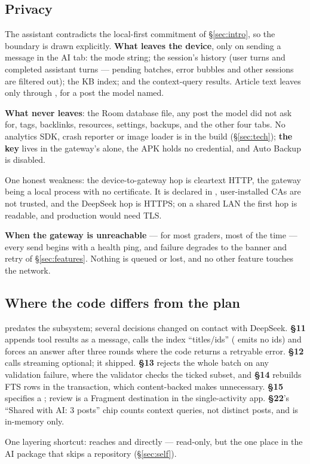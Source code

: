 \subsection{Privacy}

The assistant contradicts the local-first commitment of \S\ref{sec:intro}, so the boundary is drawn
explicitly. \textbf{What leaves the device}, only on sending a message in the AI tab: the mode string; the
session's
history (user turns and completed assistant turns --- pending batches, error bubbles and other sessions are
filtered out); the KB index; and the context-query results. Article text leaves only through
, for a post the model named.

\textbf{What never leaves}: the Room database file, any post the model did not ask for, tags, backlinks,
resources, settings, backups, and the other four tabs. No analytics SDK, crash reporter or image loader is
in the build (\S\ref{sec:tech}); \textbf{the key} lives in the gateway's  alone, the APK holds no
credential, and Auto Backup is disabled.

One honest weakness: the device-to-gateway hop is cleartext HTTP, the gateway being a local process with no
certificate. It is declared in , user-installed CAs are not trusted, and
the DeepSeek hop is HTTPS; on a shared LAN the first hop is readable, and production would need TLS.

\textbf{When the gateway is unreachable} --- for most graders, most of the time --- every send begins with a
health ping, and failure degrades to the banner and retry of \S\ref{sec:features}. Nothing is queued or
lost, and no other feature touches the network.

\subsection{Where the code differs from the plan}

 predates the subsystem; several decisions changed on contact with DeepSeek.
\textbf{\S11} appends tool results as a  message, calls the index ``titles/ids''
( emits no ids) and forces an answer after three rounds where the code returns a retryable
error. \textbf{\S12} calls streaming optional; it shipped. \textbf{\S13} rejects the whole batch on any
validation failure, where the validator checks the ticked subset, and \textbf{\S14} rebuilds FTS rows in the
transaction, which content-backed  makes unnecessary. \textbf{\S15} specifies a
; review is a Fragment destination in the single-activity app. \textbf{\S22}'s
``Shared with AI: 3 posts'' chip counts context queries, not distinct posts, and is in-memory only.

One layering shortcut:  reaches  and  directly ---
read-only, but the one place in the AI package that skips a repository (\S\ref{sec:self}).
